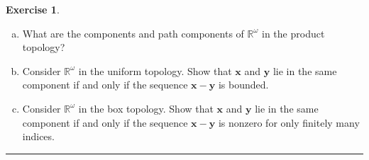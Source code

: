 \documentclass{article}
\theoremstyle{definition}
\newtheorem{exercise}{Exercise}[section]
\begin{document}
\begin{exercise}
  \begin{enumerate}[(a)]
    \item What are the components and path components of $\mathbb{R}^\omega$ in the product topology?
    \item Consider $\mathbb{R}^\omega$ in the uniform topology. Show that $\mathbf{x}$ and $\mathbf{y}$ lie in the same component if and only if the sequence $\mathbf{x} - \mathbf{y}$ is bounded.
    \item Consider $\mathbb{R}^\omega$ in the box topology. Show that $\mathbf{x}$ and $\mathbf{y}$ lie in the same component if and only if the sequence $\mathbf{x} - \mathbf{y}$ is nonzero for only finitely many indices.
  \end{enumerate}
\end{exercise}
\hrule
\end{document}
